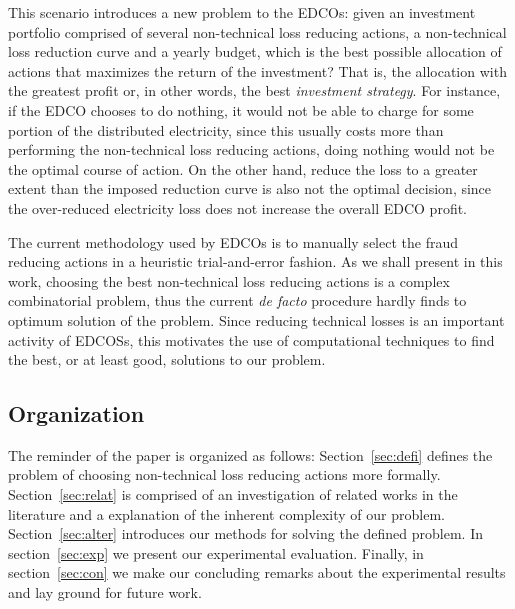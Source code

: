 This scenario introduces a new problem to the EDCOs: given an investment portfolio comprised of 
several non-technical loss reducing actions, a non-technical loss reduction curve and a yearly budget, which is the best possible 
allocation of actions that maximizes the return of the investment? That is, the 
allocation with the greatest profit or, in other words, the best \textit{investment strategy}.
For instance, if the EDCO chooses to do nothing, it would not be able to charge for some portion of the
distributed electricity,
since this usually costs more than performing the non-technical loss reducing actions, doing nothing would not
be the optimal course of action. On the other hand, reduce the loss to a greater extent than the
imposed reduction curve is also not the optimal decision, since the over-reduced electricity loss does not
increase the overall EDCO profit.

The current methodology used by EDCOs is to manually select the fraud reducing actions in
a heuristic trial-and-error fashion. As we shall present in this work, choosing the best non-technical loss reducing actions is
a complex combinatorial problem, thus the current \textit{de facto} procedure hardly finds to optimum solution of the problem.
Since reducing technical losses is an important activity of EDCOSs, this motivates the use of computational techniques to 
find the best, or at least good, solutions to our problem.


\subsection{Organization}
The reminder of the paper is organized as follows: Section~\ref{sec:defi} defines the
problem of choosing non-technical loss reducing actions more formally.
Section~\ref{sec:relat} is comprised of an investigation of related works in the literature 
and a explanation of the inherent complexity of our problem.
Section~\ref{sec:alter} introduces our methods for solving the defined problem. 
In section~\ref{sec:exp} we present our experimental evaluation. Finally, in section~\ref{sec:con} 
we make our concluding remarks about the experimental results and lay ground 
for future work.

                 
